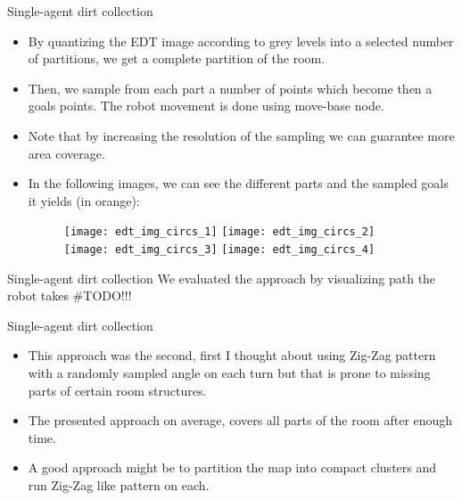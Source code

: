 \documentclass[10pt]{beamer}
\begin{document}
\begin{frame}{Single-agent dirt collection}

\graphicspath{{images/}}
\begin{itemize}
    \item By quantizing the EDT image according to grey levels into a selected number of partitions, we get a complete partition of the room.
    \item Then, we sample from each part a number of points which become then a goals points. The robot movement is done using move-base node.
    \item Note that by increasing the resolution of the sampling we can guarantee more area coverage.
    \item In the following images, we can see the different parts and the sampled goals it yields (in orange): 
    
    \bigskip
    \begin{figure}[htp]
    \texttt{[image: edt\_img\_circs\_1]}
    \texttt{[image: edt\_img\_circs\_2]}
    \texttt{[image: edt\_img\_circs\_3]}
    \texttt{[image: edt\_img\_circs\_4]}

    \label{fig:galaxy}
\end{figure}
    
\end{itemize}

\end{frame}


\begin{frame}{Single-agent dirt collection}
\bigskip 
We evaluated the approach by visualizing path the robot takes #TODO!!!
\end{frame}


\begin{frame}{Single-agent dirt collection}

\begin{itemize}
    \item This approach was the second, first I thought about using Zig-Zag pattern with a randomly sampled angle on each turn but that is prone to missing parts of certain room structures.
    \item The presented approach on average, covers all parts of the room after enough time.
    \item A good approach might be to partition the map into compact clusters and run Zig-Zag like pattern on each.
\end{itemize}

\end{frame}
\end{document}
